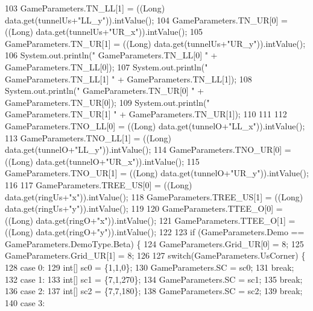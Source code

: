 \begin{DoxyCode}
103       GameParameters.TN\_LL[1] = ((Long) data.get(tunnelUs+\textcolor{stringliteral}{"LL\_y"})).intValue();
104       GameParameters.TN\_UR[0] = ((Long) data.get(tunnelUs+\textcolor{stringliteral}{"UR\_x"})).intValue();
105       GameParameters.TN\_UR[1] = ((Long) data.get(tunnelUs+\textcolor{stringliteral}{"UR\_y"})).intValue();
106       System.out.println(\textcolor{stringliteral}{" GameParameters.TN\_LL[0] "} +  GameParameters.TN\_LL[0]);
107       System.out.println(\textcolor{stringliteral}{" GameParameters.TN\_LL[1] "} +  GameParameters.TN\_LL[1]);
108       System.out.println(\textcolor{stringliteral}{" GameParameters.TN\_UR[0] "} +  GameParameters.TN\_UR[0]);
109       System.out.println(\textcolor{stringliteral}{" GameParameters.TN\_UR[1] "} +  GameParameters.TN\_UR[1]);
110 
111 
112       GameParameters.TNO\_LL[0] = ((Long) data.get(tunnelO+\textcolor{stringliteral}{"LL\_x"})).intValue();
113       GameParameters.TNO\_LL[1] = ((Long) data.get(tunnelO+\textcolor{stringliteral}{"LL\_y"})).intValue();
114       GameParameters.TNO\_UR[0] = ((Long) data.get(tunnelO+\textcolor{stringliteral}{"UR\_x"})).intValue();
115       GameParameters.TNO\_UR[1] = ((Long) data.get(tunnelO+\textcolor{stringliteral}{"UR\_y"})).intValue();
116 
117       GameParameters.TREE\_US[0] = ((Long) data.get(ringUs+\textcolor{stringliteral}{"x"})).intValue();
118       GameParameters.TREE\_US[1] = ((Long) data.get(ringUs+\textcolor{stringliteral}{"y"})).intValue();
119 
120       GameParameters.TTEE\_O[0] = ((Long) data.get(ringO+\textcolor{stringliteral}{"x"})).intValue();
121       GameParameters.TTEE\_O[1] = ((Long) data.get(ringO+\textcolor{stringliteral}{"y"})).intValue();
122 
123       \textcolor{keywordflow}{if} (GameParameters.Demo == GameParameters.DemoType.Beta) \{
124         GameParameters.Grid\_UR[0] = 8;
125         GameParameters.Grid\_UR[1] = 8;
126         
127         \textcolor{keywordflow}{switch}(GameParameters.UsCorner) \{
128           \textcolor{keywordflow}{case} 0:
129             \textcolor{keywordtype}{int}[] sc0 = \{1,1,0\};
130             GameParameters.SC = sc0;
131             \textcolor{keywordflow}{break};
132           \textcolor{keywordflow}{case} 1:
133             \textcolor{keywordtype}{int}[] sc1 = \{7,1,270\};
134             GameParameters.SC = sc1;
135             \textcolor{keywordflow}{break};
136           \textcolor{keywordflow}{case} 2:
137             \textcolor{keywordtype}{int}[] sc2 = \{7,7,180\};
138             GameParameters.SC = sc2;
139             \textcolor{keywordflow}{break};
140           \textcolor{keywordflow}{case} 3:

\end{DoxyCode}
